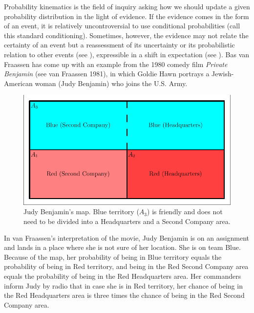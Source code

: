 \documentclass[12pt]{article}
\begin{document}
\nias Probability kinematics is the field of inquiry asking how we
should update a given probability distribution in the light of
evidence. If the evidence comes in the form of an event, it is
relatively uncontroversial to use conditional probabilities (call this
standard conditioning). Sometimes, however, the evidence may not
relate the certainty of an event but a reassessment of its uncertainty
or its probabilistic relation to other events (see
), expressible in a shift in expectation
(see ). Bas van Fraassen has come up with an
example from the 1980 comedy film \emph{Private Benjamin} (see van
Fraassen 1981)\nonsc{}, in which Goldie Hawn portrays a
Jewish-American woman (Judy Benjamin) who joins the U.S. Army.

\begin{figure}[h]
  \begin{flushright}
    \begin{minipage}[h]{.8\linewidth}
      \includegraphics[width=\textwidth]{judy.pdf}
      \caption{Judy Benjamin's map. Blue territory ($A_{3}$) is friendly and
        does not need to be divided into a Headquarters and a Second
        Company area.}
      \label{fig:map}
    \end{minipage}
  \end{flushright}
\end{figure}

In van Fraassen's interpretation of the movie, Judy Benjamin is on an
assignment and lands in a place where she is not sure of her location.
She is on team Blue. Because of the map, her probability of being in
Blue territory equals the probability of being in Red territory, and
being in the Red Second Company area equals the probability of being
in the Red Headquarters area. Her commanders inform Judy by radio that
in case she is in Red territory, her chance of being in the Red
Headquarters area is three times the chance of being in the Red Second
Company area.
\end{document}
